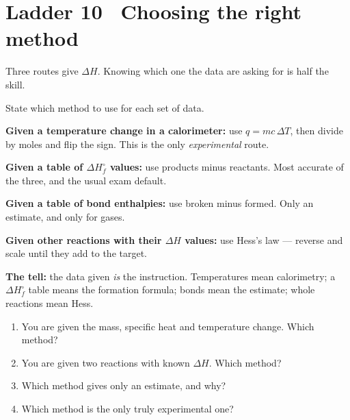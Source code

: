 \documentclass{apchem-worksheet}
\begin{document}
\section*{\sffamily Ladder 10 \textbullet\ Choosing the right method}
   

Three routes give $\Delta H$. Knowing which one the data are asking for is
half the skill.

\begin{workedexample}
State which method to use for each set of data.

\textbf{Given a temperature change in a calorimeter:} use
$q = mc\,\Delta T$, then divide by moles and flip the sign. This is the
only \emph{experimental} route.

\textbf{Given a table of $\Delta H_f^\circ$ values:} use products minus
reactants. Most accurate of the three, and the usual exam default.

\textbf{Given a table of bond enthalpies:} use broken minus formed. Only
an estimate, and only for gases.

\textbf{Given other reactions with their $\Delta H$ values:} use Hess's
law --- reverse and scale until they add to the target.

\textbf{The tell:} the data given \emph{is} the instruction. Temperatures
mean calorimetry; a $\Delta H_f^\circ$ table means the formation formula;
bonds mean the estimate; whole reactions mean Hess.
\end{workedexample}

\begin{yourturn}
\begin{enumerate}[leftmargin=*,itemsep=0.5em]
  \item You are given the mass, specific heat and temperature change.
        Which method? \workspace[1.4cm]
  \item You are given two reactions with known $\Delta H$. Which method?
        \workspace[1.4cm]
  \item Which method gives only an estimate, and why?
        \workspace[1.6cm]
  \item Which method is the only truly experimental one?
        \workspace[1.4cm]
\end{enumerate}
\end{yourturn}
\end{document}
